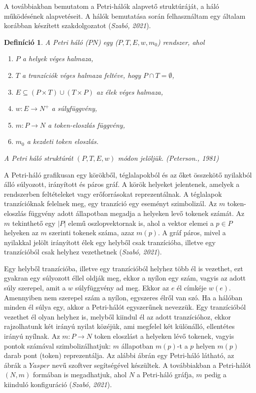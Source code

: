 \documentclass[12pt]{article}
\newtheorem{definíció}[theorem]{Definíció}
\begin{document}
A továbbiakban bemutatom a Petri-hálók alapvető struktúráját, a háló működésének alapvetéseit. A hálók bemutatása során felhasználtam egy általam korábban készített szakdolgozatot (\textit{Szabó, 2021}).

\begin{definíció}
A Petri háló ($PN$) egy ($P, T, E, w, m_0$) rendszer, ahol
\begin{enumerate}
\item $P$ a helyek véges halmaza,
\item $T$ a tranzíciók véges halmaza feltéve, hogy $P \cap T = \emptyset$,
\item $E \subseteq (P \times T) \cup (T \times P)$ az élek véges halmaza,
\item $ w: E\rightarrow N^+$ a súlyfüggvény,
\item $ m: P\rightarrow N$ a token-eloszlás függvény,
\item $ m_0$ a kezdeti token eloszlás.
\end{enumerate}
A Petri háló struktúrát $(P, T, E, w)$ módon jelöljük. (\textit{Peterson., 1981})
\end{definíció}

A Petri-háló grafikusan egy  körökből, téglalapokból és az őket összekötő nyilakból álló súlyozott, irányított és páros gráf. 
A körök helyeket jelentenek, amelyek a rendszerben feltételeket vagy erőforrásokat reprezentálnak. A téglalapok tranzícióknak felelnek meg, egy tranzíció egy eseményt szimbolizál. Az $m$ token-eloszlás függvény adott állapotban megadja a helyeken levő tokenek számát.  Az $m$ tekinthető egy $|P|$ elemű oszlopvektornak is, ahol a vektor elemei a $p\in P$ helyeken az $m$ szerinti tokenek száma, azaz $m(p)$. A gráf páros, mivel a nyilakkal jelölt irányított élek egy helyből csak tranzícióba, illetve egy tranzícióból csak helyhez vezethetnek (\textit{Szabó, 2021}).

Egy helyből tranzícióba, illetve egy tranzícióból helyhez több él is vezethet, ezt gyakran egy súlyozott éllel oldják meg, ekkor a nyílon egy szám, vagyis az adott súly szerepel, amit a $w$ súlyfüggvény ad meg. Ekkor az $e$ él címkéje $w(e)$. Amennyiben nem szerepel szám a nyílon, egyszeres élről van szó. Ha a hálóban minden él súlya egy, akkor a Petri-hálót egyszerűnek nevezzük. Egy tranzícióból vezethet él olyan helyhez is, melyből kiindul él az adott tranzícióhoz, ekkor rajzolhatunk két irányú nyilat közéjük, ami megfelel két különálló, ellentétes irányú nyílnak.
Az $m: P\rightarrow N$ token eloszlást a helyeken lévő tokenek, vagyis pontok számával szimbolizálhatjuk: $m$ állapotban $m(p)$-t a $p$ helyen $m(p)$ darab pont (token) reprezentálja. Az alábbi ábrán egy Petri-háló látható, az ábrák a $Yasper$ nevű szoftver segítségével készültek. A továbbiakban a Petri-hálót $(N,m)$ formában is megadhatjuk, ahol $N$ a Petri-háló gráfja, $m$ pedig a kiinduló konfiguráció (\textit{Szabó, 2021}).
\end{document}

